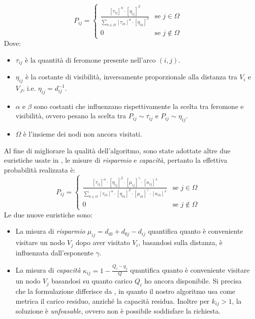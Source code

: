 \documentclass[11pt,a4paper]{article}
\begin{document}
\[
P_{ij} = 
\begin{cases} 
\frac{[\tau_{ij}]^\alpha \cdot [\eta_{ij}]^\beta}{\sum_{h \in \Omega} [\tau_{ih}]^\alpha \cdot [\eta_{ih}]^\beta} & \text{se } j \in \Omega \\ 
0 & \text{se } j \notin \Omega 
\end{cases}
\]
Dove:
\begin{itemize}
    \item \(\tau_{ij}\) è la quantità di feromone presente nell'arco \((i,j)\).
    \item \(\eta_{ij}\) è la costante di visibilità, inversamente proporzionale alla distanza tra \(V_{i}\) e \(V_{J}\), i.e. \(\eta_{ij}=d_{ij}^{-1}\).
    \item \(\alpha\) e \(\beta\) sono costanti che influenzano rispettivamente la scelta tra feromone e visibilità, ovvero pesano la scelta tra  \(P_{ij} \sim \tau_{ij}\) e \(P_{ij} \sim\eta_{ij}\).
    \item \(\Omega\) è l'insieme dei nodi non ancora visitati.
\end{itemize}

Al fine di migliorare la qualità dell'algoritmo, sono state adottate altre due euristiche usate in \cite{Bullnheimer}, le misure di \textit{risparmio} e \textit{capacità}, pertanto la effettiva probabilità realizzata è:
\[
P_{ij} = 
\begin{cases} 
\frac{[\tau_{ij}]^\alpha \cdot [\eta_{ij}]^\beta \cdot [\mu_{ij}]^\gamma \cdot [\kappa_{ij}]^\lambda}{\sum_{h \in \Omega} [\tau_{ih}]^\alpha \cdot [\eta_{ih}]^\beta\cdot [\mu_{ih}]^\gamma \cdot [\kappa_{ih}]^\lambda} & \text{se } j \in \Omega \\ 
0 & \text{se } j \notin \Omega 
\end{cases}
\]
Le due nuove euristiche sono:
\begin{itemize}
    \item La misura di \textit{risparmio} \(\mu_{ij}=d_{i0} + d_{0j} - d_{ij}\) quantifica quanto è conveniente visitare un nodo \(V_j\) dopo aver visitato \(V_i\), basandosi sulla distanza, è influenzata dall'esponente \(\gamma\).
    \item La misura di \textit{capacità} \(\kappa_{ij}=1-\frac{Q_i-q_j}{Q}\) quantifica quanto è conveniente visitare un nodo \(V_j\) basandosi su quanto carico \(Q_i\) ho ancora disponibile. Si precisa che la formulazione differisce da \cite{Bullnheimer}, in quanto il nostro algoritmo usa come metrica il carico residuo, anziché la capacità residua. Inoltre per \(k_{ij} > 1\), la soluzione è \textit{unfeasable}, ovvero non è possibile soddisfare la richiesta. 
\end{itemize}
\end{document}
